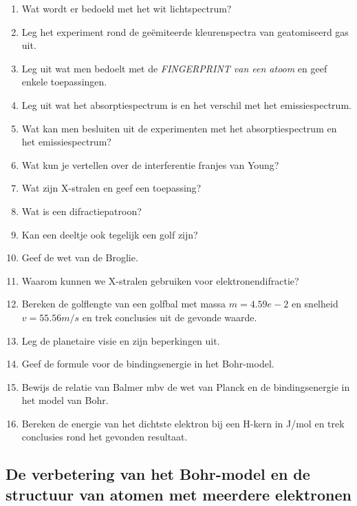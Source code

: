 \documentclass[a4paper,12pt]{article}
\begin{document}
    \begin{enumerate}
        \item Wat wordt er bedoeld met het wit lichtspectrum?
        \item Leg het experiment rond de geëmiteerde kleurenspectra van geatomiseerd gas uit.
        \item Leg uit wat men bedoelt met de \emph{FINGERPRINT van een atoom} en geef enkele toepassingen.
        \item Leg uit wat het absorptiespectrum is en het verschil met het emissiespectrum.
        \item Wat kan men besluiten uit de experimenten met het absorptiespectrum en het emissiespectrum?
        \item Wat kun je vertellen over de interferentie franjes van Young?
        \item Wat zijn X-stralen en geef een toepassing?
        \item Wat is een difractiepatroon?
        \item Kan een deeltje ook tegelijk een golf zijn?
        \item Geef de wet van de Broglie.
        \item Waarom kunnen we X-stralen gebruiken voor elektronendifractie?
        \item Bereken de golflengte van een golfbal met massa $m = 4.59e-2$ en
        snelheid $v = 55.56 m/s$ en trek conclusies uit de gevonde waarde.
        \item Leg de planetaire visie en zijn beperkingen uit.
        \item Geef de formule voor de bindingsenergie in het Bohr-model.
        \item Bewijs de relatie van Balmer mbv de wet van Planck en de bindingsenergie in het model van Bohr.
        \item Bereken de energie van het dichtste elektron bij een H-kern in J/mol en trek conclusies rond het gevonden resultaat.
    \end{enumerate}

    \subsection{De verbetering van het Bohr-model en de structuur van atomen met meerdere elektronen}
\end{document}
